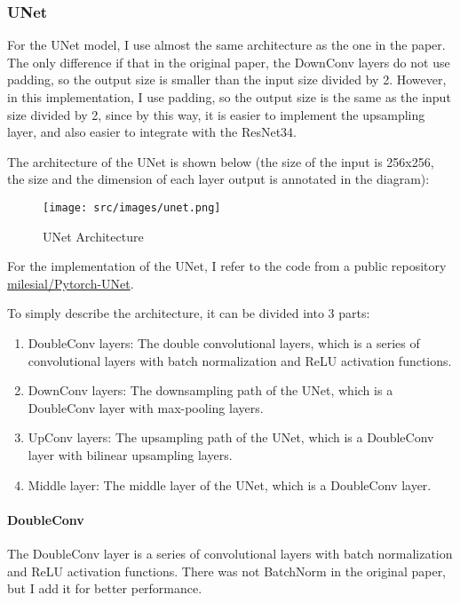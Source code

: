 \subsubsection{UNet}
For the UNet model, I use almost the same architecture as the one in the paper.
The only difference if that in the original paper, the DownConv layers do not use padding, so the output size is smaller than the input size divided by 2.
However, in this implementation, I use padding, so the output size is the same as the input size divided by 2, since by this way, it is easier to implement the upsampling layer, and also easier to integrate with the ResNet34.


The architecture of the UNet is shown below (the size of the input is 256x256, the size and the dimension of each layer output is annotated in the diagram):
\begin{figure}[H] \label{fig:unet}
    \centering
    \texttt{[image: src/images/unet.png]}
    \caption{UNet Architecture}
\end{figure}

For the implementation of the UNet, I refer to the code from a public repository \href{https://github.com/milesial/Pytorch-UNet}{milesial/Pytorch-UNet}.

To simply describe the architecture, it can be divided into 3 parts:
\begin{enumerate}
    \item DoubleConv layers: The double convolutional layers, which is a series of convolutional layers with batch normalization and ReLU activation functions.
    \item DownConv layers: The downsampling path of the UNet, which is a DoubleConv layer with max-pooling layers.
    \item UpConv layers: The upsampling path of the UNet, which is a DoubleConv layer with bilinear upsampling layers.
    \item Middle layer: The middle layer of the UNet, which is a DoubleConv layer.
\end{enumerate}

\paragraph{DoubleConv}
The DoubleConv layer is a series of convolutional layers with batch normalization and ReLU activation functions. There was not BatchNorm in the original paper, but I add it for better performance.

